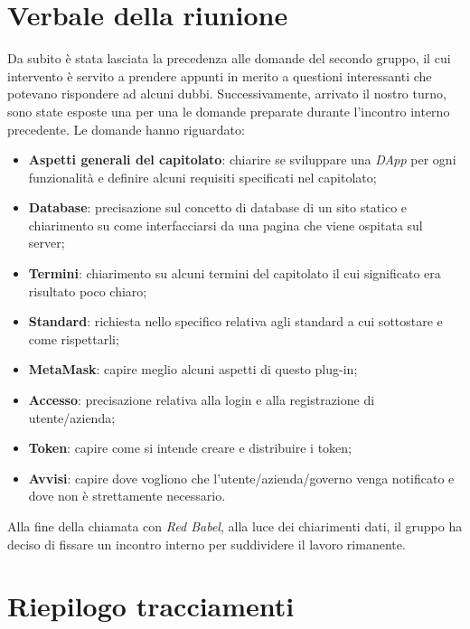\section{Verbale della riunione}
Da subito è stata lasciata la precedenza alle domande del secondo gruppo,
il cui intervento è servito a prendere appunti in merito a questioni interessanti
che potevano rispondere ad alcuni dubbi. Successivamente, arrivato il nostro turno,
sono state esposte una per una le domande preparate durante l'incontro interno 
precedente.\newline
Le domande hanno riguardato:

\begin{itemize}
	\item \textbf{Aspetti generali del capitolato}: chiarire se sviluppare una 
			\textit{DApp\glo{}} per ogni funzionalità e definire alcuni 
			requisiti specificati
			 nel capitolato;
	\item \textbf{Database}: precisazione sul concetto di database di un sito statico
			 e chiarimento su come interfacciarsi da una pagina che viene ospitata sul server;
	\item \textbf{Termini}: chiarimento su alcuni termini del capitolato il cui significato
			 era risultato poco chiaro;
	\item \textbf{Standard}: richiesta nello specifico relativa agli standard a cui sottostare
			 e come rispettarli;
	\item \textbf{MetaMask\glo{}}: capire meglio alcuni aspetti di questo 
	plug-in\glo{};
	\item \textbf{Accesso}: precisazione relativa alla login e alla registrazione di 
			 utente/azienda;
	\item \textbf{Token\glo{}}: capire come si intende creare e distribuire i 
	token\glo{};
	\item \textbf{Avvisi}: capire dove vogliono che l'utente/azienda/governo venga 
			 notificato e dove non è strettamente necessario.
\end{itemize}
Alla fine della chiamata con \textit{Red Babel}, alla luce dei chiarimenti dati,
il gruppo ha deciso di fissare un incontro interno per suddividere il lavoro rimanente.
\pagebreak

\section{Riepilogo tracciamenti}

	
